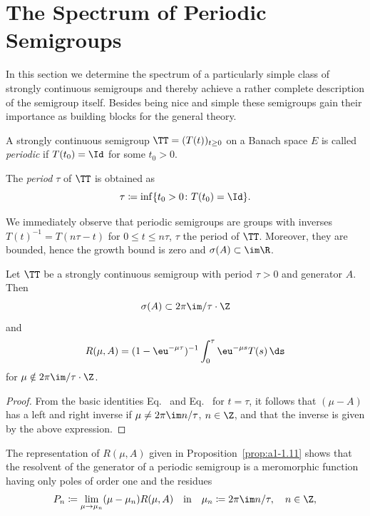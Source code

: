 \section{The Spectrum of Periodic Semigroups} \label{sec:a3-5}
In this section we determine the spectrum of a particularly simple class of strongly continuous semigroups and thereby achieve a rather complete description of the semigroup itself.
Besides being nice and simple these semigroups gain their importance as building blocks for the general theory.
\begin{definition}\label{def:a3-5.1}
A strongly continuous semigroup $\TT = (T(t))_{t \geq 0}$ on a Banach space $E$ is called \emph{periodic} if\/ $T(t_{0}) = \Id$ for some $t_{0} > 0$.

The \emph{period} $\tau$ of\/ $\TT$ is obtained as 
%
\[
	\tau \coloneqq \inf\{t_{0} > 0 \colon T(t_{0}) = \Id\} .
\]
%
\end{definition}
We immediately observe that periodic semigroups are groups with inverses $T(t)^{-1} = T(n\tau-t)$ for $0 \leq t \leq n\tau$, $\tau$ the period of\/ $\TT$.
Moreover, they are bounded, hence the growth bound is zero and $\sigma(A) \subset \im\R$.
\begin{lemma}\label{lem:a3-5.2}
Let $\TT$ be a strongly continuous semigroup with period $\tau > 0$ and generator $A$.
Then
\[
\sigma(A) \subset 2\pi \im/\tau\cdot\Z
\]
and
\begin{equation}\label{eq:a3-5.1}
R(\mu,A) = (1-\eu^{-\mu\tau})^{-1} \int_{0}^{\tau}\eu^{-\mu s}T(s) \, \ds
\end{equation}
for $\mu \notin 2\pi\im /\tau\cdot\Z$.
\end{lemma}
\begin{proof}
From the basic identities Eq.~ and Eq.~ for $t = \tau$, it follows that $(\mu - A)$ has a left and right inverse if\/ $\mu \neq 2\pi\im n/\tau$, $n \in \Z$, and that the inverse is given by the above expression.
\end{proof}
The representation of\/ $R(\mu,A)$ given in Proposition~\ref{prop:a1-1.11} shows that the resolvent of the generator of a periodic semigroup is a meromorphic function having only poles of order one and the residues
\[
P_{n} \coloneqq \lim_{\mu \to \mu_{n}} (\mu-\mu_{n})R(\mu,A) \quad \text{in} \quad \mu_{n} \coloneqq 2\pi\im n/\tau, \quad n \in \Z ,
\]
